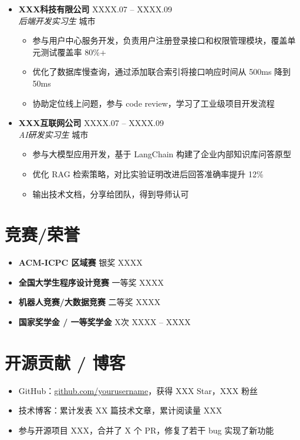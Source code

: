 \documentclass[11pt,a4paper]{article}
\newcommand{\resumeItem}[1]{\item #1}
\newcommand{\resumeSubheading}[4]{
  \vspace{-2pt}
  \item
  \textbf{#1} \hfill #2 \\
  \textit{#3} \hfill #4
  \vspace{-5pt}
}
\begin{document}
\begin{itemize}

  \resumeSubheading
    {XXX科技有限公司}{XXXX.07 -- XXXX.09}
    {后端开发实习生}{城市}
  \begin{itemize}
    \resumeItem{参与用户中心服务开发，负责用户注册登录接口和权限管理模块，覆盖单元测试覆盖率 80\%+}
    \resumeItem{优化了数据库慢查询，通过添加联合索引将接口响应时间从 500ms 降到 50ms}
    \resumeItem{协助定位线上问题，参与 code review，学习了工业级项目开发流程}
  \end{itemize}

  \resumeSubheading
    {XXX互联网公司}{XXXX.07 -- XXXX.09}
    {AI研发实习生}{城市}
  \begin{itemize}
    \resumeItem{参与大模型应用开发，基于 LangChain 构建了企业内部知识库问答原型}
    \resumeItem{优化 RAG 检索策略，对比实验证明改进后回答准确率提升 12\%}
    \resumeItem{输出技术文档，分享给团队，得到导师认可}
  \end{itemize}

\end{itemize}

\section{竞赛/荣誉}

\begin{itemize}
  \item \textbf{ACM-ICPC 区域赛} \hfill 银奖 \hfill XXXX
  \item \textbf{全国大学生程序设计竞赛} \hfill 一等奖 \hfill XXXX
  \item \textbf{机器人竞赛/大数据竞赛} \hfill 二等奖 \hfill XXXX
  \item \textbf{国家奖学金 / 一等奖学金} \hfill X次 \hfill XXXX -- XXXX
\end{itemize}

\section{开源贡献 / 博客}

\begin{itemize}
  \item GitHub：\href{https://github.com/yourusername}{github.com/yourusername}，获得 XXX Star，XXX 粉丝
  \item 技术博客：累计发表 XX 篇技术文章，累计阅读量 XXX
  \item 参与开源项目 XXX，合并了 X 个 PR，修复了若干 bug 实现了新功能
\end{itemize}
\end{document}
